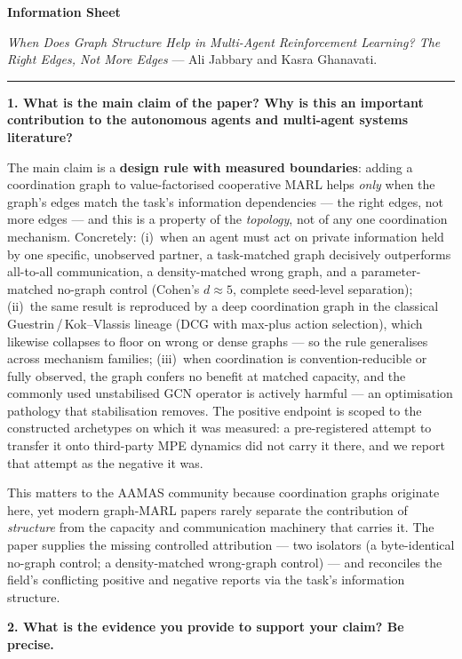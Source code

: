 \documentclass[10pt,a4paper]{article}
\newcommand{\Q}[1]{\vspace{4pt}\textbf{#1}\par\vspace{1pt}}
\begin{document}
{\large\textbf{Information Sheet}}\par\vspace{2pt}
\textit{When Does Graph Structure Help in Multi-Agent Reinforcement Learning?
The Right Edges, Not More Edges} --- Ali Jabbary and Kasra Ghanavati.
\vspace{4pt}\hrule

\Q{1. What is the main claim of the paper? Why is this an important
contribution to the autonomous agents and multi-agent systems literature?}

The main claim is a \textbf{design rule with measured boundaries}: adding a
coordination graph to value-factorised cooperative MARL helps \emph{only} when
the graph's edges match the task's information dependencies --- the right edges,
not more edges --- and this is a property of the \emph{topology}, not of any one
coordination mechanism. Concretely: (i)~when an agent must act on private
information held by one specific, unobserved partner, a task-matched graph
decisively outperforms all-to-all communication, a density-matched wrong graph,
and a parameter-matched no-graph control (Cohen's $d \approx 5$, complete
seed-level separation); (ii)~the same result is reproduced by a deep
coordination graph in the classical Guestrin\,/\,Kok--Vlassis lineage (DCG with
max-plus action selection), which likewise collapses to floor on wrong or dense
graphs --- so the rule generalises across mechanism families; (iii)~when
coordination is convention-reducible or fully observed, the graph confers no
benefit at matched capacity, and the commonly used unstabilised GCN operator is
actively harmful --- an optimisation pathology that stabilisation removes. The
positive endpoint is scoped to the constructed archetypes on which it was
measured: a pre-registered attempt to transfer it onto third-party MPE dynamics
did not carry it there, and we report that attempt as the negative it was.

This matters to the AAMAS community because coordination graphs originate here,
yet modern graph-MARL papers rarely separate the contribution of \emph{structure}
from the capacity and communication machinery that carries it. The paper supplies
the missing controlled attribution --- two isolators (a byte-identical no-graph
control; a density-matched wrong-graph control) --- and reconciles the field's
conflicting positive and negative reports via the task's information structure.

\Q{2. What is the evidence you provide to support your claim? Be precise.}
\end{document}
